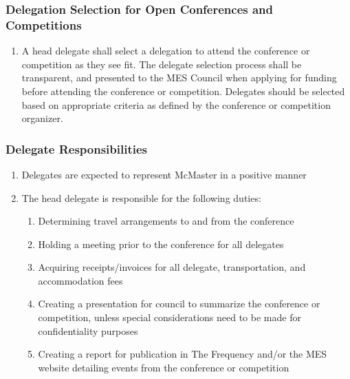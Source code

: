 \subsubsection{Delegation Selection for Open Conferences and Competitions}
\label{delegation-selection-for-open-conferences-and-competitions}

\begin{enumerate}
 \item
  A head delegate shall select a delegation to attend the conference or
  competition as they see fit. The delegate selection process shall be
  transparent, and presented to the MES Council when applying for
  funding before attending the conference or competition. Delegates
  should be selected based on appropriate criteria as defined by the
  conference or competition organizer.
\end{enumerate}

\subsubsection{Delegate Responsibilities}
\label{delegate-responsibilities}
\begin{enumerate}
 \item
  Delegates are expected to represent McMaster in a positive manner
 \item
  The head delegate is responsible for the following duties:

  \begin{enumerate}
   \item
    Determining travel arrangements to and from the conference
   \item
    Holding a meeting prior to the conference for all delegates
   \item
    Acquiring receipts/invoices for all delegate, transportation, and
    accommodation fees
   \item
    Creating a presentation for council to summarize the conference or
    competition, unless special considerations need to be made for
    confidentiality purposes
   \item
    Creating a report for publication in The Frequency and/or the MES
    website detailing events from the conference or competition

  \end{enumerate}
\end{enumerate}

